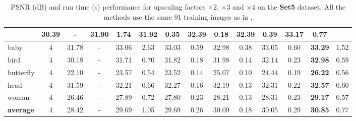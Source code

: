 \documentclass[10pt,journal,compsoc]{IEEEtran}
\begin{document}
\begin{table*}[t!]
\begin{tabular}{|l| c| c| c| c| c| c| c| c| c| c| c|c| c|}
& 30.39 & - & 31.90 & 1.74 & 31.92 & 0.35 & 32.39 & 0.18 & 32.39 & 0.39 & \textbf{33.17} & 0.77\\
\hline\hline
baby & 4 & 31.78 & - & 33.06 & 2.63 & 33.03 & 0.59 & 32.98 & 0.38 & 33.05 & 0.60 & \textbf{33.29} & 1.52\\
bird  & 4 & 30.18 & - &31.71 & 0.70 & 31.82 & 0.18 & 31.98 & 0.14 & 32.14 & 0.23 & \textbf{32.98} & 0.59 \\
butterfly  & 4 & 22.10 & - & 23.57 & 0.54 & 23.52 & 0.14 & 25.07 & 0.10 & 24.44 & 0.19 & \textbf{26.22} & 0.56\\
head  & 4 & 31.59 & - & 32.21 & 0.66 &32.27 & 0.16 & 32.19 & 0.13 & 32.31 & 0.22 & \textbf{32.57} & 0.60\\
woman  & 4 & 26.46 & - & 27.89 & 0.72 & 27.80 & 0.23 & 28.21 & 0.13 & 28.31 & 0.23 & \textbf{29.17} & 0.57\\
\hline\hline
\rowcolor[gray]{0.85} \textbf{average}  & 4
& 28.42 & - & 29.69 & 1.05 & 29.69 & 0.26 & 30.09 & 0.18 & 30.05 & 0.29 & \textbf{30.85} & 0.77\\
\hline
\end{tabular}\vspace*{0.2cm}
\caption{PSNR (dB) and run time (s) performance for upscaling factors $\times 2$, $\times 3$ and $\times 4$ on the 
\textbf{Set5} dataset. All the methods use the same 91 training images as in \cite{ANR}.}\label{table:set5}
\vspace*{-0.5cm}
\end{table*}
\end{document}
